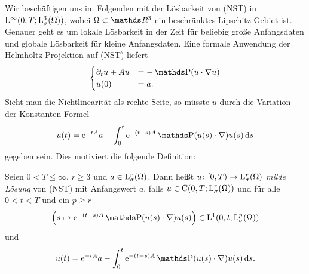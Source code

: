 Wir beschäftigen uns im Folgenden mit der Lösbarkeit von (NST) in $\mathrm{L}^\infty(0,T; \mathrm{L}^3_\sigma(\Omega))$, wobei $\Omega \subset \R^3$ ein beschränktes Lipschitz-Gebiet ist.
Genauer geht es um lokale Lösbarkeit in der Zeit für beliebig große Anfangsdaten und globale Lösbarkeit für kleine Anfangsdaten. Eine formale Anwendung der Helmholtz-Projektion auf (NST) liefert
$$
\begin{cases}
  \partial_t u + Au & = - \PP(u\cdot \nabla u) \\
  u(0) &= a.
\end{cases}
$$
Sieht man die Nichtlinearität als rechte Seite, so müsste $u$ durch die Variation-der-Konstanten-Formel
$$
u(t) = \e^{-tA} a - \int_0^t \e^{-(t - s)A}\PP(u(s) \cdot \nabla) u(s) \d s
$$
gegeben sein. 
Dies motiviert die folgende Definition:
\begin{defn}
  Seien $0 < T \leq \infty$, $r \geq 3$ und $a \in \mathrm{L}_\sigma^r(\Omega)$.
  Dann heißt $u \colon [0,T) \to \mathrm{L}_\sigma^r(\Omega)$ \emph{milde Lösung} von (NST) mit  Anfangswert $a$, falls $u \in \mathrm{C}(0,T; \mathrm{L}_\sigma^r(\Omega))$ und für alle $0 < t< T$ und ein $p \geq r$
  $$
  \Big( s \mapsto \e^{-(t - s)A} \PP (u(s) \cdot \nabla) u(s) \Big) \in \Ell^1(0,t; \Ell_\sigma^p(\Omega))
  $$
  und
  $$
  u(t) = \e^{-t A} a - \int_0^t \e^{-(t- s) A} \PP(u(s) \cdot \nabla )u(s) \d s.
  $$
\end{defn}

